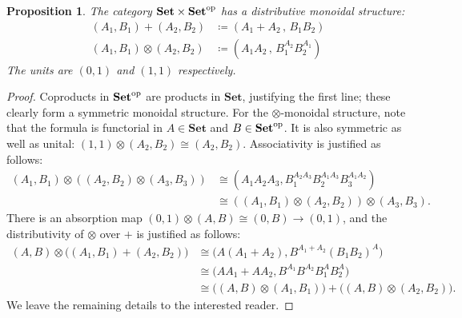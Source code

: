 \documentclass[11pt, one side, article]{memoir}
\theoremstyle{definition}
\theoremstyle{plain}
\newtheorem{proposition}[definitionx]{Proposition}
\newcommand{\Cat}[1]{\mathbf{#1}}%
\newcommand{\op}{^\tn{op}}
\newcommand{\tn}[1]{\textnormal{#1}}
\newcommand{\smset}{\Cat{Set}}
\newcommand{\0}{\textsf{0}}
\newcommand{\1}{\tn{\textsf{1}}}
\begin{document}
\begin{proposition}
The category $\smset\times\smset\op$ has a distributive monoidal structure:
\begin{align}
  (A_1,B_1)+(A_2,B_2)&\coloneqq(A_1+A_2\,,\,B_1B_2)
  \label{eqn.sum_geomean}\\\label{eqn.prod_prod}
  (A_1,B_1)\otimes(A_2,B_2)&\coloneqq(A_1A_2\,,\,B_1^{A_2}B_2^{A_1})
\end{align}
The units are $(0,1)$ and $(1,1)$ respectively.
\end{proposition}
\begin{proof}
Coproducts in $\smset\op$ are products in $\smset$, justifying the first line; these clearly form a symmetric monoidal structure. For the $\otimes$-monoidal structure, note that the formula is functorial in $A\in\smset$ and $B\in\smset\op$. It is also symmetric as well as unital: $(1,1)\otimes(A_2,B_2)\cong(A_2,B_2)$. Associativity is justified as follows:
\begin{align*}
  (A_1,B_1)\otimes((A_2,B_2)\otimes(A_3,B_3))&\cong
	(A_1A_2A_3,B_1^{A_2A_3}B_2^{A_1A_3}B_3^{A_1A_2})\\&\cong
	((A_1,B_1)\otimes(A_2,B_2))\otimes(A_3,B_3).
\end{align*}
There is an absorption map $(0,1)\otimes (A,B)\cong(0,B)\to(0,1)$, and the distributivity of $\otimes$ over $+$ is justified as follows:
\begin{align*}
  (A,B)\otimes\big((A_1,B_1)+(A_2,B_2)\big)&\cong 
  \big(A(A_1+A_2),B^{A_1+A_2}(B_1B_2)^A\big)\\&\cong
  \big(AA_1+AA_2,B^{A_1}B^{A_2}B_1^AB_2^A\big)\\&\cong
  \big((A,B)\otimes(A_1,B_1))+((A,B)\otimes(A_2,B_2)\big).
\end{align*}
We leave the remaining details to the interested reader.
\end{proof}
\end{document}
